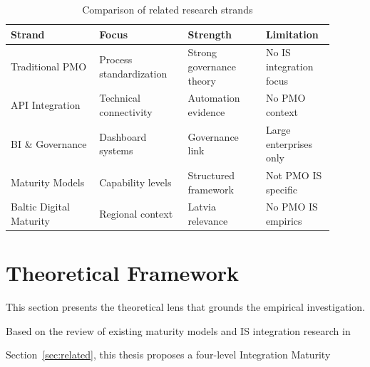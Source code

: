 \begin{table}[h] 

  \caption{Comparison of related research strands} 

  \label{tab:related-work} 

  \centering 

  {\singlespacing 

  \begin{tabular}{p{0.25\linewidth}p{0.25\linewidth}p{0.22\linewidth}p{0.18\linewidth}} 

    \toprule 

    \textbf{Strand} & \textbf{Focus} & \textbf{Strength} & \textbf{Limitation}\\ 

    \midrule 

    Traditional PMO & Process standardization & Strong governance theory & No IS integration focus\\ 

    API Integration & Technical connectivity & Automation evidence & No PMO context\\ 

    BI \& Governance & Dashboard systems & Governance link & Large enterprises only\\ 

    Maturity Models & Capability levels & Structured framework & Not PMO IS specific\\ 

    Baltic Digital Maturity & Regional context & Latvia relevance & No PMO IS empirics\\ 

    \bottomrule 

  \end{tabular} 

  } 

\end{table} 

\section{Theoretical Framework} 

\label{sec:theory} 

  

This section presents the theoretical lens that grounds the empirical investigation.  

Based on the review of existing maturity models and IS integration research in  

Section~\ref{sec:related}, this thesis proposes a four-level Integration Maturity  

